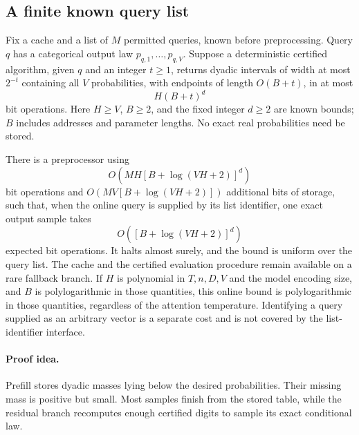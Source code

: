 \subsection{A finite known query list}
\label{sec:finite-query-list}

\begin{theorem}
\label{thm:finite-query-list}
Fix a cache and a list of $M$ permitted queries, known before
preprocessing. Query $q$ has a categorical output law
$p_{q,1},\ldots,p_{q,V}$. Suppose a deterministic certified algorithm,
given $q$ and an integer $t\ge1$, returns dyadic intervals of width
at most $2^{-t}$ containing all $V$ probabilities, with endpoints
of length $O(B+t)$, in at most
\[
 H(B+t)^d
\]
bit operations. Here $H\ge V$, $B\ge2$, and the fixed integer $d\ge2$
are known bounds; $B$ includes addresses and parameter lengths.
No exact real probabilities need be stored.

There is a preprocessor using
\[
 O\!\left(MH[B+\log(VH+2)]^d\right)
\]
bit operations and
$O(MV[B+\log(VH+2)])$ additional bits of storage, such that, when the
online query is supplied by its list identifier, one exact output
sample takes
\[
 O\!\left([B+\log(VH+2)]^d\right)
\]
expected bit operations. It halts almost surely, and the bound is
uniform over the query list. The cache and the certified evaluation
procedure remain available on a rare fallback branch. If $H$ is
polynomial in $T,n,D,V$ and the model encoding size, and $B$ is
polylogarithmic in those quantities, this online bound is
polylogarithmic in those quantities, regardless of the attention
temperature. Identifying a query supplied as an arbitrary vector is
a separate cost and is not covered by the list-identifier interface.
\end{theorem}
\paragraph{Proof idea.}
Prefill stores dyadic masses lying below the desired probabilities.  Their missing mass is positive but small.  Most samples finish from the stored table, while the residual branch recomputes enough certified digits to sample its exact conditional law.

